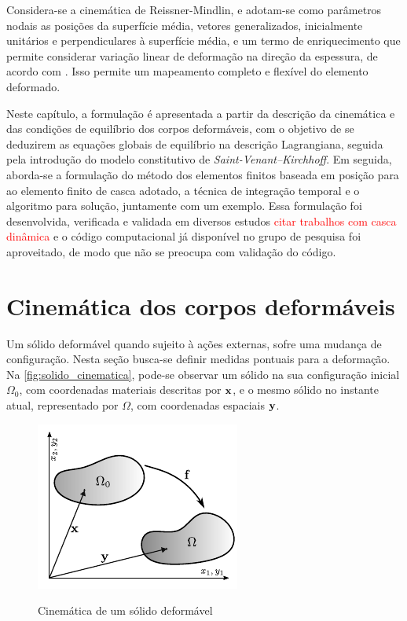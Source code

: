 Considera-se a cinemática de Reissner-Mindlin, e adotam-se como parâmetros nodais as posições da superfície média, vetores generalizados, inicialmente unitários e perpendiculares à superfície média, e um termo de enriquecimento que permite considerar variação linear de deformação na direção da espessura, de acordo com . Isso permite um mapeamento completo e flexível do elemento deformado. 

Neste capítulo, a formulação é apresentada a partir da descrição da cinemática e das condições de equilíbrio dos corpos deformáveis, com o objetivo de se deduzirem as equações globais de equilíbrio na descrição Lagrangiana, seguida pela introdução do modelo constitutivo de \textit{Saint-Venant–Kirchhoff}. Em seguida, aborda-se a formulação do método dos elementos finitos baseada em posição para ao elemento finito de casca adotado, a técnica de integração temporal e o algoritmo para solução, juntamente com um exemplo. Essa formulação foi desenvolvida, verificada e validada em diversos estudos \cite{Coda.., SanchesC:2013, SanchesC:2014, FernandesCS:2018} \textcolor{red}{citar trabalhos com casca dinâmica} e o código computacional já disponível no grupo de pesquisa foi aproveitado, de modo que não se preocupa com validação do código. 

\section{Cinemática dos corpos deformáveis}

Um sólido deformável quando sujeito à ações externas, sofre uma mudança de configuração. Nesta seção busca-se definir medidas pontuais para a deformação. Na \autoref{fig:solido_cinematica}, pode-se observar um sólido na sua configuração inicial $\Omega_{0}$, com coordenadas materiais descritas por $\mathbf{x}$, e o mesmo sólido no instante atual, representado por $\Omega$, com coordenadas espaciais $\mathbf{y}$. 

\begin{figure}[!htbp]
	\caption{Cinemática de um sólido deformável}
	\centering
	\includegraphics[scale=1.7]{Imagens/Cap4/sol_cinematica.pdf}	
	\label{fig:solido_cinematica}
\end{figure}

